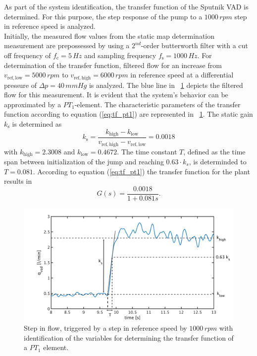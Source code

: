 As part of the system identification, the transfer function of the Sputnik VAD is determined. For this purpose, the step response of the pump to a $1000\,rpm$ step in reference speed is analyzed.
\\Initially, the measured flow values from the static map determination measurement are prepossessed by using a $2^{nd}$-order butterworth filter with a cut off frequency of $f_{\mathrm{c}} = 5\,Hz$ and sampling frequency $f_{\mathrm{s}}=1000 \, Hz$. For determination of the transfer function, filtered flow for an increase from $v_{\mathrm{ref,low}}=5000\,rpm$ to $v_{\mathrm{ref,high}}=6000\,rpm$ in reference speed at a differential pressure of $\Delta{p}=40\,mmHg$ is analyzed. The blue line in \figurename~\ref{fig:plant} depicts the filtered flow for this measurement. It is evident that the system's behavior can be approximated by a $PT_1$-element.
 The characteristic parameters of the transfer function according to equation (\ref{eq:tf_pt1}) are represented in \figurename~\ref{fig:plant}. The static gain $k_{\mathrm{s}}$ is determined as
\begin{equation}
  k_{\mathrm{s}} = \frac{k_{\mathrm{high}}-k_{\mathrm{low}}}{v_{\mathrm{ref,high}}-v_{\mathrm{ref,low}}}=0.0018
\label{eq:k_s_1}
\end{equation}
with $k_{\mathrm{high}}=2.3008$ and $k_{\mathrm{low}}=0.4672$. The time constant $T$, defined as the time span between initialization of the jump and reaching $0.63 \cdot k_s$, is determinded to $T=0.081$.
According to equation (\ref{eq:tf_pt1}) the transfer function for the plant results in
\begin{equation}
    G(s) = \frac{0.0018}{1+0.081s}.
 \label{eq:plant}
\end{equation}
\begin{figure}[ht!]
  \centering
  \includegraphics[width=\textwidth]{images/chapt_4/plant_generation.pdf}
  \caption[Transfer function of Sputnik VAD]{Step in flow, triggered by a step in reference speed by $1000\,rpm$ with identification of the variables for determining the transfer function of a $PT_{\mathrm{1}}$ element.}
  \label{fig:plant}
\end{figure}

